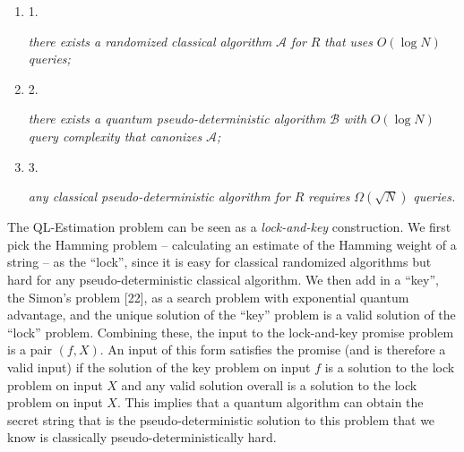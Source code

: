 \begin{enumerate}


\item[] 
1. 


\emph{there exists a randomized classical algorithm }$\mathcal{A}$\emph{ for }${R}$\emph{ that uses }$O(\log N)$\emph{ queries;}\par





\item[] 
2. 


\emph{there exists a quantum pseudo-deterministic algorithm }$\mathcal{B}$\emph{ with }$O(\log N)$\emph{ query complexity that canonizes }$\mathcal{A}$\emph{;}\par





\item[] 
3. 


\emph{any classical pseudo-deterministic algorithm for }${R}$\emph{ requires }$\Omega(\sqrt{N})$\emph{ queries.}\par





\end{enumerate}







The QL-Estimation problem can be seen as
a \emph{lock-and-key} construction. We first pick the Hamming problem – calculating an estimate of the Hamming weight of a string – as the “lock”, since it is easy for classical randomized algorithms but hard for any pseudo-deterministic classical algorithm. We then add in a “key”, the Simon’s problem [22], as a search problem with exponential quantum advantage, and the unique solution of the “key” problem is a valid solution of the “lock” problem.
Combining these, the input to the lock-and-key promise problem is a pair $(f,X)$. An input of this form satisfies the promise (and is therefore a valid input) if the solution of the key problem on input $f$ is a solution to the lock problem on input $X$ and any valid solution overall is a solution to the lock problem on input $X$. This implies that a quantum algorithm can obtain the secret string that is the pseudo-deterministic solution to this problem that we know is classically pseudo-deterministically hard.\par




